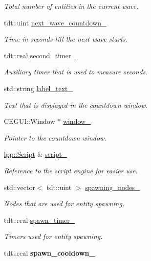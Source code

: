 \begin{DoxyCompactItemize}
\begin{DoxyCompactList}\small\item\em Total number of entities in the current wave. \end{DoxyCompactList}\item 
tdt\+::uint \hyperlink{class_wave_system_ae70ca36a66a8df6d356539c7e0cc0e19}{next\+\_\+wave\+\_\+countdown\+\_\+}
\begin{DoxyCompactList}\small\item\em Time in seconds till the next wave starts. \end{DoxyCompactList}\item 
tdt\+::real \hyperlink{class_wave_system_a9d249d2778d8f7a618274bcc6b8ed3aa}{second\+\_\+timer\+\_\+}
\begin{DoxyCompactList}\small\item\em Auxiliary timer that is used to measure seconds. \end{DoxyCompactList}\item 
std\+::string \hyperlink{class_wave_system_a1c1cc583c1285417a68295bed7272fe3}{label\+\_\+text\+\_\+}
\begin{DoxyCompactList}\small\item\em Text that is displayed in the countdown window. \end{DoxyCompactList}\item 
C\+E\+G\+U\+I\+::\+Window $\ast$ \hyperlink{class_wave_system_ab945c8a6f6608420128bc1e0c101cb09}{window\+\_\+}
\begin{DoxyCompactList}\small\item\em Pointer to the countdown window. \end{DoxyCompactList}\item 
\hyperlink{classlpp_1_1_script}{lpp\+::\+Script} \& \hyperlink{class_wave_system_a0a4f867a7e8179bb77235e4d66bdc67e}{script\+\_\+}
\begin{DoxyCompactList}\small\item\em Reference to the script engine for easier use. \end{DoxyCompactList}\item 
std\+::vector$<$ tdt\+::uint $>$ \hyperlink{class_wave_system_a28ea2af56b6debb00a1fd780b8ace530}{spawning\+\_\+nodes\+\_\+}
\begin{DoxyCompactList}\small\item\em Nodes that are used for entity spawning. \end{DoxyCompactList}\item 
tdt\+::real \hyperlink{class_wave_system_ada44d4ac39d896951051bb1e983a0f1b}{spawn\+\_\+timer\+\_\+}
\begin{DoxyCompactList}\small\item\em Timers used for entity spawning. \end{DoxyCompactList}\item 
tdt\+::real {\bfseries spawn\+\_\+cooldown\+\_\+}\hypertarget{class_wave_system_aa13206e3d5916cfb9062adec8cb99bcd}{}\label{class_wave_system_aa13206e3d5916cfb9062adec8cb99bcd}


\end{DoxyCompactItemize}
